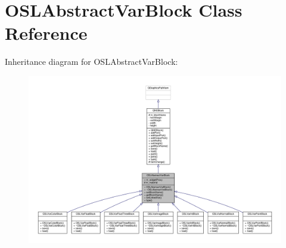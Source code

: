 \hypertarget{class_o_s_l_abstract_var_block}{\section{O\-S\-L\-Abstract\-Var\-Block Class Reference}
\label{class_o_s_l_abstract_var_block}
}


Inheritance diagram for O\-S\-L\-Abstract\-Var\-Block\-:
\nopagebreak
\begin{figure}[H]
\begin{center}
\leavevmode
\includegraphics[width=350pt]{class_o_s_l_abstract_var_block__inherit__graph}
\end{center}
\end{figure}


